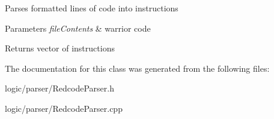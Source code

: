 Parses formatted lines of code into instructions 
\begin{DoxyParams}{Parameters}
{\em file\+Contents} & warrior code \\
\hline
\end{DoxyParams}
\begin{DoxyReturn}{Returns}
vector of instructions 
\end{DoxyReturn}


The documentation for this class was generated from the following files\+:\begin{DoxyCompactItemize}
\item 
logic/parser/Redcode\+Parser.\+h\item 
logic/parser/Redcode\+Parser.\+cpp\end{DoxyCompactItemize}
